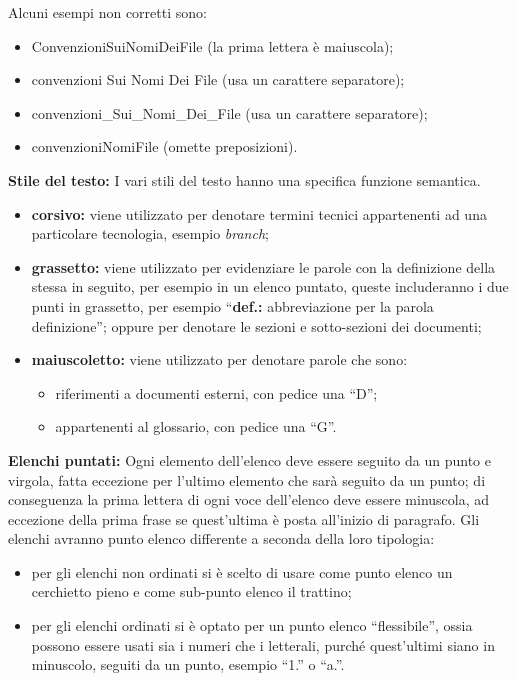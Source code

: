 					Alcuni esempi non corretti sono:
					\begin{itemize}
						\item ConvenzioniSuiNomiDeiFile (la prima lettera è maiuscola);
						\item convenzioni Sui Nomi Dei File (usa un carattere separatore);
						\item convenzioni\_Sui\_Nomi\_Dei\_File (usa un carattere separatore);
						\item convenzioniNomiFile (omette preposizioni).
					\end{itemize}
				\textbf{Stile del testo: }
					I vari stili del testo hanno una specifica funzione semantica.
					\begin{itemize}
						\item \textbf{corsivo:} viene utilizzato per denotare termini tecnici appartenenti ad una particolare tecnologia, esempio \textit{branch};
						\item \textbf{grassetto:} viene utilizzato per evidenziare le parole con la definizione della stessa in seguito, per esempio in un elenco puntato, queste includeranno i due punti in grassetto, per esempio ``\textbf{def.:} abbreviazione per la parola definizione''; oppure per denotare le sezioni e sotto-sezioni dei documenti;
						\item \textbf{maiuscoletto:} viene utilizzato per denotare parole che sono:
							\begin{itemize}
								\item riferimenti a documenti esterni, con pedice una ``D'';
								\item appartenenti al glossario, con pedice una ``G''.
							\end{itemize}
					\end{itemize}
				\textbf{Elenchi puntati: }
					Ogni elemento dell'elenco deve essere seguito da un punto e virgola, fatta eccezione per l'ultimo elemento che sarà seguito da un punto; di conseguenza la prima lettera di ogni voce dell'elenco deve essere minuscola, ad eccezione della prima frase se quest'ultima è posta all'inizio di paragrafo. Gli elenchi avranno punto elenco differente a seconda della loro tipologia:
					\begin{itemize}
						\item per gli elenchi non ordinati si è scelto di usare come punto elenco un cerchietto pieno e come sub-punto elenco il trattino;
						\item per gli elenchi ordinati si è optato per un punto elenco ``flessibile'', ossia possono essere usati sia i numeri che i letterali, purché quest'ultimi siano in minuscolo, seguiti da un punto, esempio ``1.'' o ``a.''.
					\end{itemize}
